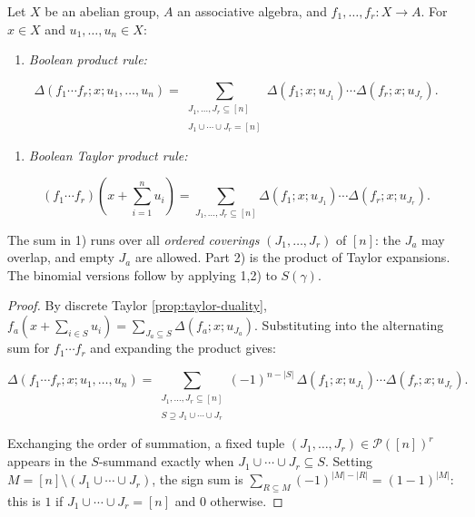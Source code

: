 \documentclass[10pt,a4paper]{amsart}
\newcommand{\KP}{\mathcal{P}}
\newcommand{\tightlist}{\setlength{\itemsep}{0pt}\setlength{\parskip}{0pt}}
\begin{document}
\begin{theorem}

\label{thm:product-rule} Let \(X\) be an abelian group, \(A\) an
associative algebra, and \(f_1,\dots,f_r: X \to A\). For \(x \in X\) and
\(u_1,\dots,u_n \in X\):

\begin{enumerate}
\def\labelenumi{\arabic{enumi})}
\tightlist
\item
  \emph{Boolean product rule:}
\end{enumerate}

\[
  \Delta(f_1 \cdots f_r; x; u_1,\dots,u_n)
  =
  \sum_{\substack{J_1,\dots,J_r \subseteq [n] \\\\ J_1 \cup \cdots \cup J_r = [n]}}
  \Delta(f_1; x; u_{J_1}) \cdots \Delta(f_r; x; u_{J_r}).
\]

\begin{enumerate}
\def\labelenumi{\arabic{enumi})}
\setcounter{enumi}{1}
\tightlist
\item
  \emph{Boolean Taylor product rule:}
\end{enumerate}

\[
  (f_1 \cdots f_r)(x + {\textstyle\sum_{i=1}^n} u_i)
  =
  \sum_{J_1, \dots, J_r \subseteq [n]}
  \Delta(f_1; x; u_{J_1}) \cdots \Delta(f_r; x; u_{J_r}).
\]

The sum in 1) runs over all \emph{ordered coverings} \((J_1,\dots,J_r)\)
of \([n]\): the \(J_a\) may overlap, and empty \(J_a\) are allowed. Part
2) is the product of Taylor expansions. The binomial versions follow by
applying 1,2) to \(S(\gamma)\).

\end{theorem}

\begin{proof}

By discrete Taylor \ref{prop:taylor-duality},
\(f_a(x + \sum_{i \in S} u_i) = \sum_{J_a \subseteq S} \Delta(f_a; x; u_{J_a})\).
Substituting into the alternating sum for \(f_1 \cdots f_r\) and
expanding the product gives:

\[
  \Delta(f_1 \cdots f_r; x; u_1, \dots, u_n)
  =
  \sum_{\substack{J_1, \dots, J_r \subseteq [n] \\\\ S \supseteq J_1 \cup \cdots \cup J_r}}
  (-1)^{n-|S|}\,
  \Delta(f_1; x; u_{J_1}) \cdots \Delta(f_r; x; u_{J_r}).
\]

Exchanging the order of summation, a fixed tuple
\((J_1, \dots, J_r) \in \KP([n])^r\) appears in the \(S\)-summand
exactly when \(J_1 \cup \cdots \cup J_r \subseteq S\). Setting
\(M = [n] \setminus (J_1 \cup \cdots \cup J_r)\), the sign sum is
\(\sum_{R \subseteq M} (-1)^{|M|-|R|} = (1-1)^{|M|}\): this is \(1\) if
\(J_1 \cup \cdots \cup J_r = [n]\) and \(0\) otherwise.

\end{proof}
\end{document}
